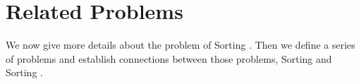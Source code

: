 \chapter{Related Problems}

We now give more details about the problem of Sorting \XY. Then we
define a series of problems and establish connections between those problems,
Sorting and Sorting \XY.
